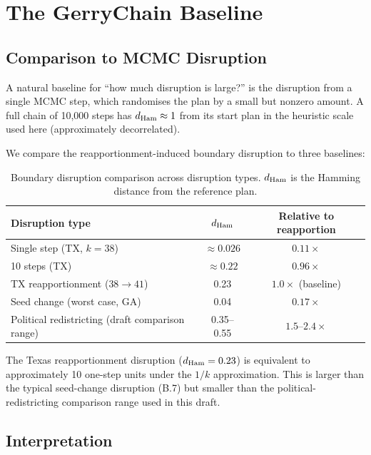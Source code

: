 \section{The GerryChain Baseline}
\label{sec:gerrychain-baseline}

\subsection{Comparison to MCMC Disruption}

A natural baseline for ``how much disruption is large?'' is the disruption
from a single \recom{} MCMC step, which randomises the plan by a small
but nonzero amount.
A full \recom{} chain of 10{,}000 steps has $d_{\rm Ham} \approx 1$ from
its start plan in the heuristic scale used here (approximately decorrelated).

We compare the reapportionment-induced boundary disruption to three
baselines:

\begin{table}[h]
\centering
\caption{Boundary disruption comparison across disruption types.
         $d_{\rm Ham}$ is the Hamming distance from the reference plan.}
\label{tab:disruption-comparison}
\begin{tabular}{lcc}
\toprule
Disruption type & $d_{\rm Ham}$ & Relative to reapportion \\
\midrule
Single \recom{} step (TX, $k=38$) & $\approx 0.026$ & $0.11\times$ \\
10 \recom{} steps (TX) & $\approx 0.22$ & $0.96\times$ \\
TX reapportionment ($38\to41$) & 0.23 & $1.0\times$ (baseline) \\
Seed change (worst case, GA) & 0.04 & $0.17\times$ \\
Political redistricting (draft comparison range) & 0.35--0.55 & $1.5$--$2.4\times$ \\
\bottomrule
\end{tabular}
\end{table}

The Texas reapportionment disruption ($d_{\rm Ham} = 0.23$) is equivalent
to approximately 10 one-step \recom{} units under the $1/k$ approximation.
This is larger than the typical seed-change disruption (B.7) but
smaller than the political-redistricting comparison range used in this draft.

\subsection{Interpretation}

